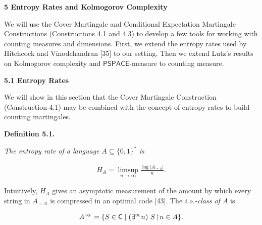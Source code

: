 \documentclass[10pt,a4paper]{article}
\begin{document}
\par\medskip\noindent\textbf{
5 Entropy Rates and Kolmogorov Complexity}\par




We will use the Cover Martingale and Conditional Expectation Martingale Constructions (Constructions 4.1 and 4.3) to develop a few tools for working with counting measures and dimensions. First, we extend the entropy rates used by Hitchcock and Vinodchandran [35] to our setting. Then we extend Lutz’s results on Kolmogorov complexity and $\mathsf{PSPACE}$-measure to counting measure.\par




\par\medskip\noindent\textbf{
5.1 Entropy Rates}\par




We will show in this section that the Cover Martingale Construction (Construction 4.1) may be combined with the concept of entropy rates to build counting martingales.\par





\par\medskip\noindent\textbf{
\textbf{Definition 5.1}\textbf{.}
}\par



\emph{The entropy
rate of a language $A\subseteq\{0,1\}^{*}$
is}\par


\[\begin{gathered}
H_{A}=\limsup\limits_{n\to\infty}\frac{\log|A_{=n}|}{n}.
\end{gathered}\]






Intuitively, $H_{A}$ gives an asymptotic measurement of the amount by
which every string in $A_{=n}$ is compressed in an optimal code [43].
The \emph{i.o.-class
of $A$} is\par


\[\begin{gathered}
A^{\mathsf{i.o.}}=\{S\in\mathsf{C}\mid(\exists^{\infty}n)\ S\negthinspace\upharpoonright\negthinspace n\in A\}.
\end{gathered}\]
\end{document}

